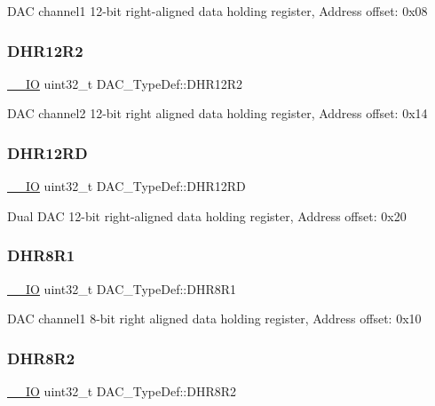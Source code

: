 D\+AC channel1 12-\/bit right-\/aligned data holding register, Address offset\+: 0x08 \mbox{\label{struct_d_a_c___type_def_ab1f777540c487c26bf27e6fa37a644cc}} 
\subsubsection{\texorpdfstring{DHR12R2}{DHR12R2}}
{\footnotesize\ttfamily \mbox{\hyperlink{core__sc300_8h_aec43007d9998a0a0e01faede4133d6be}{\+\_\+\+\_\+\+IO}} uint32\+\_\+t D\+A\+C\+\_\+\+Type\+Def\+::\+D\+H\+R12\+R2}

D\+AC channel2 12-\/bit right aligned data holding register, Address offset\+: 0x14 \mbox{\label{struct_d_a_c___type_def_affa5cc9fe0cc9eb594d703bdc9d9abd9}} 
\subsubsection{\texorpdfstring{DHR12RD}{DHR12RD}}
{\footnotesize\ttfamily \mbox{\hyperlink{core__sc300_8h_aec43007d9998a0a0e01faede4133d6be}{\+\_\+\+\_\+\+IO}} uint32\+\_\+t D\+A\+C\+\_\+\+Type\+Def\+::\+D\+H\+R12\+RD}

Dual D\+AC 12-\/bit right-\/aligned data holding register, Address offset\+: 0x20 \mbox{\label{struct_d_a_c___type_def_a3a382d341fb608a04390bacb8c00b0f0}} 
\subsubsection{\texorpdfstring{DHR8R1}{DHR8R1}}
{\footnotesize\ttfamily \mbox{\hyperlink{core__sc300_8h_aec43007d9998a0a0e01faede4133d6be}{\+\_\+\+\_\+\+IO}} uint32\+\_\+t D\+A\+C\+\_\+\+Type\+Def\+::\+D\+H\+R8\+R1}

D\+AC channel1 8-\/bit right aligned data holding register, Address offset\+: 0x10 \mbox{\label{struct_d_a_c___type_def_a3b096b71656f8fb32cd18b4c8b1d2334}} 
\subsubsection{\texorpdfstring{DHR8R2}{DHR8R2}}
{\footnotesize\ttfamily \mbox{\hyperlink{core__sc300_8h_aec43007d9998a0a0e01faede4133d6be}{\+\_\+\+\_\+\+IO}} uint32\+\_\+t D\+A\+C\+\_\+\+Type\+Def\+::\+D\+H\+R8\+R2}

